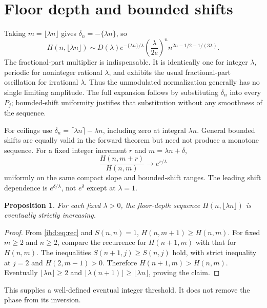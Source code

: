 \documentclass[11pt,letterpaper]{article}
\newtheorem{proposition}[theorem]{Proposition}
\theoremstyle{remark}\newtheorem{remark}[theorem]{Remark}
\begin{document}
\section{Floor depth and bounded shifts}\label{ibd:pd:sec:floors}
Taking $m=\lfloor\lambda n\rfloor$ gives $\delta_n=-\{\lambda n\}$, so
\begin{equation}\label{ibd:pd:eq:floor}
 H(n,\lfloor\lambda n\rfloor)\sim
 D(\lambda)e^{-\{\lambda n\}/\lambda}
 \left(\frac{\lambda}{2e}\right)^n n^{2n-1/2-1/(3\lambda)}.
\end{equation}
The fractional-part multiplier is indispensable. It is identically one for integer $\lambda$, periodic for noninteger rational $\lambda$, and exhibits the usual fractional-part oscillation for irrational $\lambda$. Thus the unmodulated normalization generally has no single limiting amplitude. The full expansion follows by substituting $\delta_n$ into every $P_j$; bounded-shift uniformity justifies that substitution without any smoothness of the sequence.

For ceilings use $\delta_n=\lceil\lambda n\rceil-\lambda n$, including zero at integral $\lambda n$. General bounded shifts are equally valid in the forward theorem but need not produce a monotone sequence. For a fixed integer increment $r$ and $m=\lambda n+\delta$,
\begin{equation}\label{ibd:pd:eq:shiftratio}
 \frac{H(n,m+r)}{H(n,m)}\longrightarrow e^{r/\lambda}
\end{equation}
uniformly on the same compact slope and bounded-shift ranges. The leading shift dependence is $e^{\delta/\lambda}$, not $e^\delta$ except at $\lambda=1$.

\begin{proposition}\label{ibd:pd:prop:monotone}
For each fixed $\lambda>0$, the floor-depth sequence $H(n,\lfloor\lambda n\rfloor)$ is eventually strictly increasing.
\end{proposition}
\begin{proof}
From \eqref{ibd:eq:rec} and $S(n,n)=1$, $H(n,m+1)\geq H(n,m)$. For fixed $m\geq2$ and $n\geq2$, compare the recurrence for $H(n+1,m)$ with that for $H(n,m)$. The inequalities $S(n+1,j)\geq S(n,j)$ hold, with strict inequality at $j=2$ and $H(2,m-1)>0$. Therefore $H(n+1,m)>H(n,m)$. Eventually $\lfloor\lambda n\rfloor\geq2$ and $\lfloor\lambda(n+1)\rfloor\geq\lfloor\lambda n\rfloor$, proving the claim.
\end{proof}
This supplies a well-defined eventual integer threshold. It does not remove the phase from its inversion.
\end{document}

